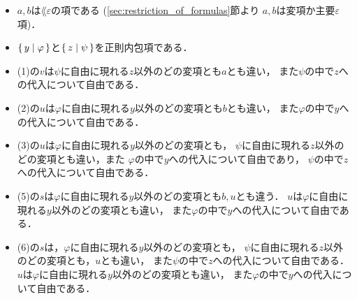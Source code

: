 	\begin{itemize}
		\item $a,b$は$\lang{\varepsilon}$の項である
			(\ref{sec:restriction_of_formulas}節より
			$a,b$は変項か主要$\varepsilon$項)．
		
		\item $\{\, y \mid \varphi\, \}$と$\{\, z \mid \psi\, \}$を正則内包項である．
		
		\item (1)の$v$は$\psi$に自由に現れる$z$以外のどの変項とも$a$とも違い，
			また$\psi$の中で$z$への代入について自由である．
		
		\item (2)の$u$は$\varphi$に自由に現れる$y$以外のどの変項とも$b$とも違い，
			また$\varphi$の中で$y$への代入について自由である．
			
		\item (3)の$u$は$\varphi$に自由に現れる$y$以外のどの変項とも，
			$\psi$に自由に現れる$z$以外のどの変項とも違い，また
			$\varphi$の中で$y$への代入について自由であり，
			$\psi$の中で$z$への代入について自由である．
		
		\item (5)の$s$は$\varphi$に自由に現れる$y$以外のどの変項とも$b,u$とも違う．
			$u$は$\varphi$に自由に現れる$y$以外のどの変項とも違い，
			また$\varphi$の中で$y$への代入について自由である．
		
		\item (6)の$s$は，$\varphi$に自由に現れる$y$以外のどの変項とも，
			$\psi$に自由に現れる$z$以外のどの変項とも，$u$とも違い，
			また$\psi$の中で$z$への代入について自由である．
			$u$は$\varphi$に自由に現れる$y$以外のどの変項とも違い，
			また$\varphi$の中で$y$への代入について自由である．
			

\end{itemize}
